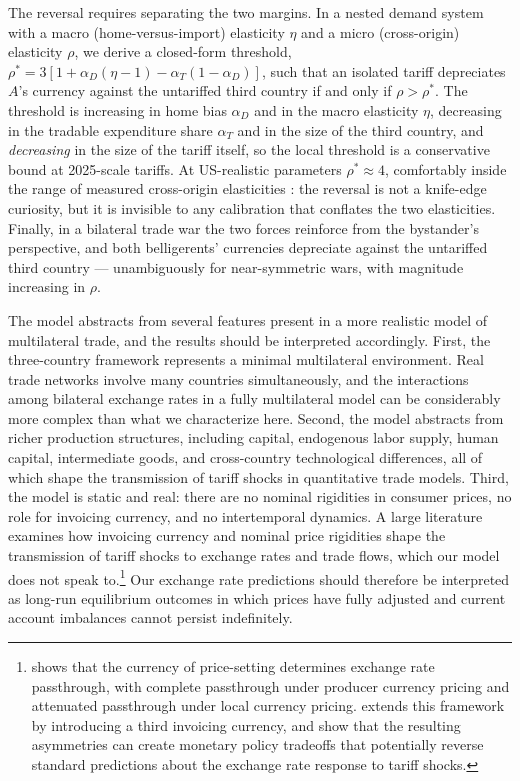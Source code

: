 \documentclass[11pt]{article}
\theoremstyle{plain}
\theoremstyle{remark}
\numberwithin{lemma}{section}
\numberwithin{proposition}{section}
\numberwithin{corollary}{section}
\newenvironment{revblock}{\par\begingroup\color{RevBlue}}{\endgroup\par}
\begin{document}
\begin{revblock}
The reversal requires separating the two margins. In a nested demand system with a macro (home-versus-import) elasticity $\eta$ and a micro (cross-origin) elasticity $\rho$, we derive a closed-form threshold, $\rho^* = 3\left[1 + \alpha_D(\eta - 1) - \alpha_T(1-\alpha_D)\right]$, such that an isolated tariff depreciates $A$'s currency against the untariffed third country if and only if $\rho > \rho^*$. The threshold is increasing in home bias $\alpha_D$ and in the macro elasticity $\eta$, decreasing in the tradable expenditure share $\alpha_T$ and in the size of the third country, and \emph{decreasing} in the size of the tariff itself, so the local threshold is a conservative bound at 2025-scale tariffs. At US-realistic parameters $\rho^* \approx 4$, comfortably inside the range of measured cross-origin elasticities \citep{feenstra2018, broda2006, fajgelbaum2024trade}: the reversal is not a knife-edge curiosity, but it is invisible to any calibration that conflates the two elasticities. Finally, in a bilateral trade war the two forces reinforce from the bystander's perspective, and both belligerents' currencies depreciate against the untariffed third country --- unambiguously for near-symmetric wars, with magnitude increasing in $\rho$.
\end{revblock}

The model abstracts from several features present in a more realistic model of multilateral trade, and the results should be interpreted accordingly. First, the three-country framework represents a minimal multilateral environment. Real trade networks involve many countries simultaneously, and the interactions among bilateral exchange rates in a fully multilateral model can be considerably more complex than what we characterize here. Second, the model abstracts from richer production structures, including capital, endogenous labor supply, human capital, intermediate goods, and cross-country technological differences, all of which shape the transmission of tariff shocks in quantitative trade models. Third, the model is static and real: there are no nominal rigidities in consumer prices, no role for invoicing currency, and no intertemporal dynamics. A large literature examines how invoicing currency and nominal price rigidities shape the transmission of tariff shocks to exchange rates and trade flows, which our model does not speak to.\footnote{\cite{devereux2003monetary} shows that the currency of price-setting determines exchange rate passthrough, with complete passthrough under producer currency pricing and attenuated passthrough under local currency pricing. \cite{gopinath2020dominant} extends this framework by introducing a third invoicing currency, and \cite{bergin2023macroeconomic} show that the resulting asymmetries can create monetary policy tradeoffs that potentially reverse standard predictions about the exchange rate response to tariff shocks.} Our exchange rate predictions should therefore be interpreted as long-run equilibrium outcomes in which prices have fully adjusted and current account imbalances cannot persist indefinitely.
\end{document}
